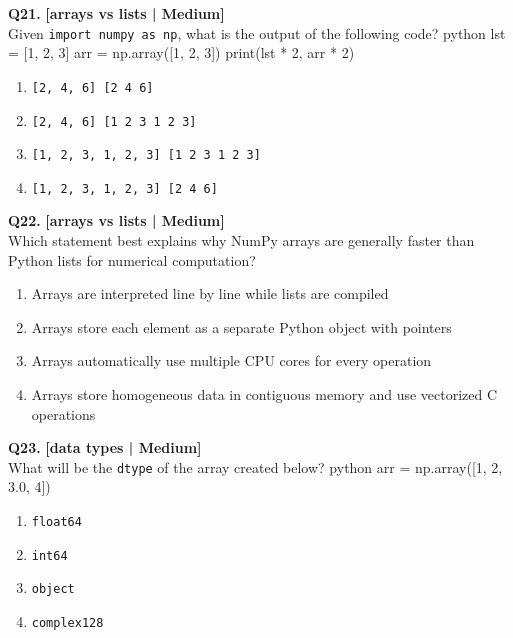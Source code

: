 \noindent\textbf{Q21.} \hfill {\small\color{LPUOrange}\textbf{[arrays vs lists | Medium]}}\\[2pt]
Given \texttt{import numpy as np}, what is the output of the following code? 
 python 
 lst = [1, 2, 3] 
 arr = np.array([1, 2, 3]) 
 print(lst * 2, arr * 2)

\begin{enumerate}[label=(\alph*),topsep=2pt,itemsep=1pt,partopsep=0pt,parsep=0pt]
    \item \relax \texttt{[2, 4, 6] [2 4 6]}
    \item \relax \texttt{[2, 4, 6] [1 2 3 1 2 3]}
    \item \relax \texttt{[1, 2, 3, 1, 2, 3] [1 2 3 1 2 3]}
    \item \relax \texttt{[1, 2, 3, 1, 2, 3] [2 4 6]}
\end{enumerate}
\vspace{2mm}

\noindent\textbf{Q22.} \hfill {\small\color{LPUOrange}\textbf{[arrays vs lists | Medium]}}\\[2pt]
Which statement best explains why NumPy arrays are generally faster than Python lists for numerical computation?

\begin{enumerate}[label=(\alph*),topsep=2pt,itemsep=1pt,partopsep=0pt,parsep=0pt]
    \item \relax Arrays are interpreted line by line while lists are compiled
    \item \relax Arrays store each element as a separate Python object with pointers
    \item \relax Arrays automatically use multiple CPU cores for every operation
    \item \relax Arrays store homogeneous data in contiguous memory and use vectorized C operations
\end{enumerate}
\vspace{2mm}

\noindent\textbf{Q23.} \hfill {\small\color{LPUOrange}\textbf{[data types | Medium]}}\\[2pt]
What will be the \texttt{dtype} of the array created below? 
 python 
 arr = np.array([1, 2, 3.0, 4])

\begin{enumerate}[label=(\alph*),topsep=2pt,itemsep=1pt,partopsep=0pt,parsep=0pt]
    \item \relax \texttt{float64}
    \item \relax \texttt{int64}
    \item \relax \texttt{object}
    \item \relax \texttt{complex128}
\end{enumerate}
\vspace{2mm}

